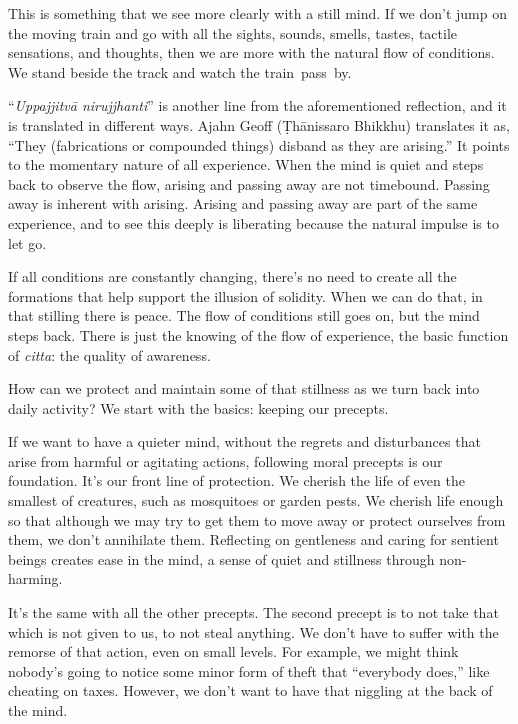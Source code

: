 This is something that we see more clearly with a still mind. If we don't jump on the moving train and go with all the sights, sounds, smells, tastes, tactile sensations, and thoughts, then we are more with the natural flow of conditions. We stand beside the track and watch the \mbox{train pass by.}

``\emph{Uppajjitvā nirujjhanti}'' is another line from the aforementioned reflection, and it is translated in different ways. Ajahn Geoff (Ṭhānissaro Bhikkhu) translates it as, ``They (fabrications or compounded things) disband as they are arising.'' It points to the momentary nature of all experience. When the mind is quiet and steps back to observe the flow, arising and passing away are not timebound. Passing away is inherent with arising. Arising and passing away are part of the same experience, and to see this deeply is liberating because the natural impulse is to let go.

\enlargethispage{1\baselineskip}
If all conditions are constantly changing, there's no need to create all the formations that help support the illusion of solidity. When we can do that, in that stilling there is peace. The flow of conditions still goes on, but the mind steps back. There is just the knowing of the flow of experience, the basic function of \emph{citta}: the quality of awareness.

How can we protect and maintain some of that stillness as we turn back into daily activity? We start with the basics: keeping our precepts.

If we want to have a quieter mind, without the regrets and disturbances that arise from harmful or agitating actions, following moral precepts is our foundation. It's our front line of protection. We cherish the life of even the smallest of creatures, such as mosquitoes or garden pests. We cherish life enough so that although we may try to get them to move away or protect ourselves from them, we don't annihilate them. Reflecting on gentleness and caring for sentient beings creates ease in the mind, a sense of quiet and stillness through non-harming.

It's the same with all the other precepts. The second precept is to not take that which is not given to us, to not steal anything. We don't have to suffer with the remorse of that action, even on small levels. For example, we might think nobody's going to notice some minor form of theft that ``everybody does,'' like cheating on taxes. However, we don't want to have that niggling at the back of the mind.

